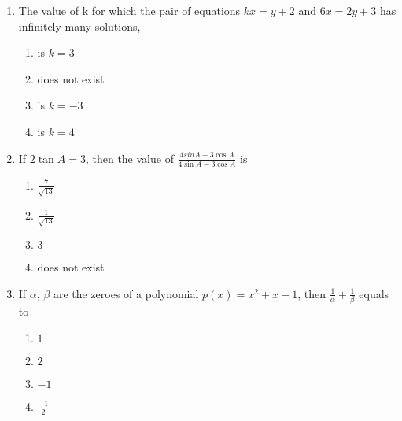 \begin{enumerate}
\item The value of k for which the pair of equations $kx=y+2$ and $6x=2y+3$ has infinitely many solutions,
\begin{enumerate}
\item is $k=3$
\item does not exist
\item is $k=-3$
\item is $k=4$
\end{enumerate}


\item If $2\tan A=3$, then the value of $\frac{4sin A + 3\cos A}{4\sin A - 3\cos A}$ is
\begin{enumerate}
\item $\frac{7}{\sqrt{13}}$
\item $\frac{1}{\sqrt{13}}$
\item $3$
\item does not exist
\end{enumerate}


\item If $\alpha$, $\beta$ are the zeroes of a polynomial $p(x)=x^2+x-1$, then $\frac{1}{\alpha}+\frac{1}{\beta}$ equals to 
\begin{enumerate}
\item $1$
\item $2$
\item $-1$
\item $\frac{-1}{2}$
\end{enumerate}


\end{enumerate}
